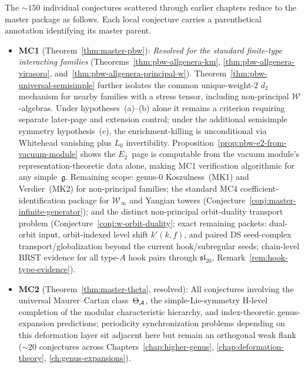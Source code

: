 \begin{remark}\label{rem:conjecture-dependencies}
The ${\sim}150$ individual conjectures scattered through earlier
chapters reduce to the master package as follows.
Each local conjecture carries a parenthetical annotation identifying
its master parent.
\begin{itemize}
\item \textbf{MC1} (Theorem~\ref{thm:master-pbw}):
  \emph{Resolved for the standard finite-type interacting families}
  (Theorems~\ref{thm:pbw-allgenera-km},
  \ref{thm:pbw-allgenera-virasoro},
  and~\ref{thm:pbw-allgenera-principal-w}).
  Theorem~\ref{thm:pbw-universal-semisimple} further isolates the
  common unique-weight-$2$ $d_2$ mechanism for nearby families with a
  stress tensor, including non-principal $\mathcal{W}$-algebras.
  Under hypotheses~(a)--(b) alone it remains a criterion requiring
  separate later-page and extension control; under the additional
  semisimple symmetry hypothesis~(c), the enrichment-killing is
  unconditional via Whitehead vanishing plus $L_0$ invertibility.
  Proposition~\ref{prop:pbw-e2-from-vacuum-module} shows the
  $E_2$~page is computable from the vacuum module's
  representation-theoretic data alone, making MC1 verification
  algorithmic for any simple~$\mathfrak{g}$.
  Remaining scope: genus-$0$ Koszulness~(MK1) and
  Verdier~(MK2) for non-principal families;
  the standard MC4 coefficient-identification package for
  $\mathcal{W}_\infty$ and Yangian towers
  (Conjecture~\ref{conj:master-infinite-generator});
  and the distinct non-principal orbit-duality transport problem
  (Conjecture~\ref{conj:w-orbit-duality}; exact remaining packets:
  dual-orbit input, orbit-indexed level shift $k'(k,f)$, and paired
  DS seed-complex transport/globalization beyond the current
  hook/subregular seeds; chain-level
  BRST evidence for all type-$A$ hook pairs through
  $\mathfrak{sl}_{20}$, Remark~\ref{rem:hook-type-evidence}).
\item \textbf{MC2} (Theorem~\ref{thm:master-theta}, resolved):
  All conjectures involving the universal Maurer--Cartan class~$\Theta_{\mathcal{A}}$,
  the simple-Lie-symmetry H-level completion of the modular
  characteristic hierarchy,
  and index-theoretic genus-expansion predictions; periodicity
  synchronization problems depending on this deformation layer sit
  adjacent here but remain an orthogonal weak flank (${\sim}20$
  conjectures across Chapters~\ref{chap:higher-genus},
  \ref{chap:deformation-theory}, \ref{ch:genus-expansions}).

\end{itemize}
\end{remark}
